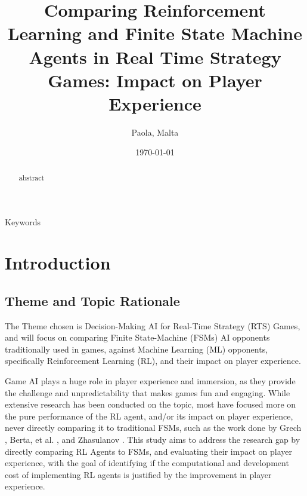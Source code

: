 \documentclass[conference]{IEEEtran}
\begin{document}
\title{Comparing Reinforcement Learning and Finite State Machine Agents in Real Time Strategy Games: Impact on Player Experience}

\author{
	Paola, Malta
}

\date{\today}

\maketitle

\begin{abstract}
	abstract
\end{abstract}

\begin{IEEEkeywords}
	Keywords
\end{IEEEkeywords}

\section{Introduction}


\subsection{Theme and Topic Rationale}

The Theme chosen is Decision-Making AI for Real-Time Strategy (RTS) Games, and will focus on comparing Finite State-Machine (FSMs) AI opponents traditionally used in games, against Machine Learning (ML) opponents, specifically
Reinforcement Learning (RL), and their impact on player experience.

Game AI plays a huge role in player experience and immersion, as they provide the challenge and unpredictability that makes games fun and engaging.
While extensive research has been conducted on the topic, most have focused more on the pure performance of the RL agent, and/or its impact on player experience, never directly
comparing it to traditional FSMs, such as the work done by Grech \cite{grech_creating_2023}, Berta, et al. \cite{bin_ramlan_implementation_2021}, and Zhasulanov \cite{zhasulanov_enhancing_2024}.
This study aims to address the research gap by directly comparing RL Agents to FSMs, and evaluating their impact on player experience, with the goal of identifying if the computational
and development cost of implementing RL agents is justified by the improvement in player experience.
\end{document}
